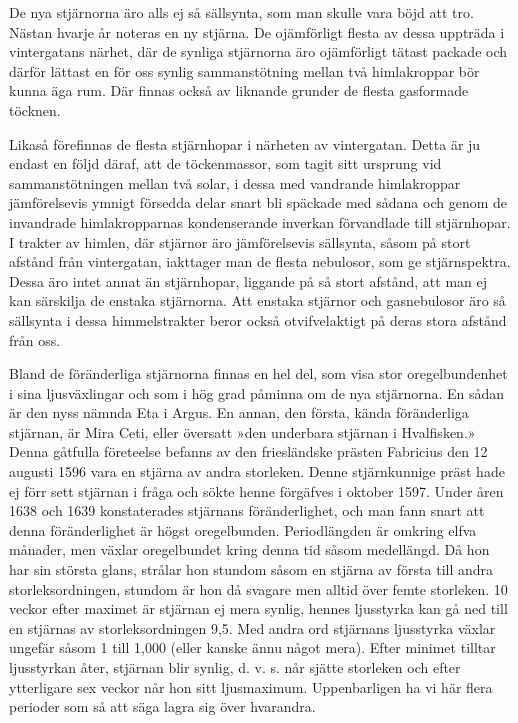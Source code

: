 \documentclass[a4paper, 12pt, oneside, swedish]{article}
\begin{document}
De nya stjärnorna äro alls ej så sällsynta, som man skulle vara böjd att tro. Nästan hvarje år noteras en ny stjärna. De ojämförligt flesta av dessa uppträda i vintergatans närhet, där de synliga stjärnorna äro ojämförligt tätast packade och därför lättast en för oss synlig sammanstötning mellan två himlakroppar bör kunna äga rum. Där finnas också av liknande grunder de flesta gasformade töcknen.

Likaså förefinnas de flesta stjärnhopar i närheten av vintergatan. Detta är ju endast en följd däraf, att de töckenmassor, som tagit sitt ursprung vid sammanstötningen mellan två solar, i dessa med vandrande himlakroppar jämförelsevis ymnigt försedda delar snart bli späckade med sådana och genom de invandrade himlakropparnas kondenserande inverkan förvandlade till stjärnhopar. I trakter av himlen, där stjärnor äro jämförelsevis sällsynta, såsom på stort afstånd från vintergatan, iakttager man de flesta nebulosor, som ge stjärnspektra. Dessa äro intet annat än stjärnhopar, liggande på så stort afstånd, att man ej kan särskilja de enstaka stjärnorna. Att enstaka stjärnor och gasnebulosor äro så sällsynta i dessa himmelstrakter beror också otvifvelaktigt på deras stora afstånd från oss.

Bland de föränderliga stjärnorna finnas en hel del, som visa stor oregelbundenhet i sina ljusväxlingar och som i hög grad påminna om de nya stjärnorna. En sådan är den nyss nämnda Eta i Argus. En annan, den första, kända föränderliga stjärnan, är Mira Ceti, eller översatt »den underbara stjärnan i Hvalfisken.» Denna gåtfulla företeelse befanns av den friesländske prästen Fabricius den 12 augusti 1596 vara en stjärna av andra storleken. Denne stjärnkunnige präst hade ej förr sett stjärnan i fråga och sökte henne förgäfves i oktober 1597. Under åren 1638 och 1639 konstaterades stjärnans föränderlighet, och man fann snart att denna föränderlighet är högst oregelbunden. Periodlängden är omkring elfva månader, men växlar oregelbundet kring denna tid såsom medellängd. Då hon har sin största glans, strålar hon stundom såsom en stjärna av första till andra storleksordningen, stundom är hon då svagare men alltid över femte storleken. 10 veckor efter maximet är stjärnan ej mera synlig, hennes ljusstyrka kan gå ned till en stjärnas av storleksordningen 9,5. Med andra ord stjärnans ljusstyrka växlar ungefär såsom 1 till 1,000 (eller kanske ännu något mera). Efter minimet tilltar ljusstyrkan åter, stjärnan blir synlig, d. v. s. når sjätte storleken och efter ytterligare sex veckor når hon sitt ljusmaximum. Uppenbarligen ha vi här flera perioder som så att säga lagra sig över hvarandra.
\end{document}
